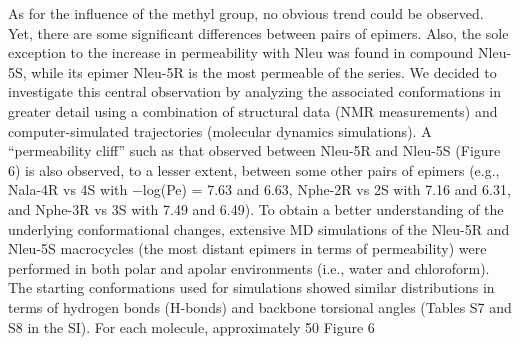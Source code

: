 As for the influence of the methyl group, no obvious trend could be observed. Yet, there are some significant differences between pairs of epimers. Also, the sole exception to the increase in permeability with Nleu was found in compound Nleu-5S, while its epimer Nleu-5R is the most permeable of the series. We decided to investigate this central observation by analyzing the associated conformations in greater detail using a combination of structural data (NMR measurements) and computer-simulated trajectories (molecular dynamics simulations).
A “permeability cliff” such as that observed between Nleu-5R and Nleu-5S (Figure 6) is also observed, to a lesser extent, between some other pairs of epimers (e.g., Nala-4R vs 4S with −log(Pe) = 7.63 and 6.63, Nphe-2R vs 2S with 7.16 and 6.31, and Nphe-3R vs 3S with 7.49 and 6.49). To obtain a better understanding of the underlying conformational changes, extensive MD simulations of the Nleu-5R and Nleu-5S macrocycles (the most distant epimers in terms of permeability) were performed in both polar and apolar environments (i.e., water and chloroform). The starting conformations used for simulations showed similar distributions in terms of hydrogen bonds (H-bonds) and backbone torsional angles (Tables S7 and S8 in the SI). For each molecule, approximately 50%
Figure 6

